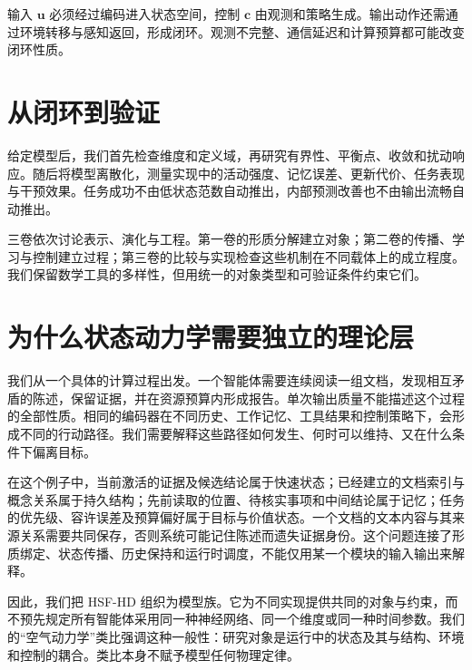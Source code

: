 输入 $\mathbf{u}$ 必须经过编码进入状态空间，控制 $\mathbf{c}$ 由观测和策略生成。输出动作还需通过环境转移与感知返回，形成闭环。观测不完整、通信延迟和计算预算都可能改变闭环性质。

\section*{从闭环到验证}
给定模型后，我们首先检查维度和定义域，再研究有界性、平衡点、收敛和扰动响应。随后将模型离散化，测量实现中的活动强度、记忆误差、更新代价、任务表现与干预效果。任务成功不由低状态范数自动推出，内部预测改善也不由输出流畅自动推出。

三卷依次讨论表示、演化与工程。第一卷的形质分解建立对象；第二卷的传播、学习与控制建立过程；第三卷的比较与实现检查这些机制在不同载体上的成立程度。我们保留数学工具的多样性，但用统一的对象类型和可验证条件约束它们。

\section*{为什么状态动力学需要独立的理论层}
我们从一个具体的计算过程出发。一个智能体需要连续阅读一组文档，发现相互矛盾的陈述，保留证据，并在资源预算内形成报告。单次输出质量不能描述这个过程的全部性质。相同的编码器在不同历史、工作记忆、工具结果和控制策略下，会形成不同的行动路径。我们需要解释这些路径如何发生、何时可以维持、又在什么条件下偏离目标。

在这个例子中，当前激活的证据及候选结论属于快速状态；已经建立的文档索引与概念关系属于持久结构；先前读取的位置、待核实事项和中间结论属于记忆；任务的优先级、容许误差及预算偏好属于目标与价值状态。一个文档的文本内容与其来源关系需要共同保存，否则系统可能记住陈述而遗失证据身份。这个问题连接了形质绑定、状态传播、历史保持和运行时调度，不能仅用某一个模块的输入输出来解释。

因此，我们把 HSF-HD 组织为模型族。它为不同实现提供共同的对象与约束，而不预先规定所有智能体采用同一种神经网络、同一个维度或同一种时间参数。我们的“空气动力学”类比强调这种一般性：研究对象是运行中的状态及其与结构、环境和控制的耦合。类比本身不赋予模型任何物理定律。


